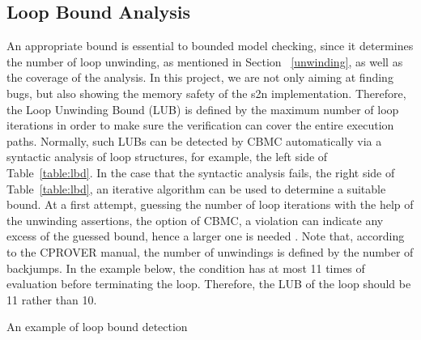 \subsection{Loop Bound Analysis}
\label{sec:lba}
An appropriate bound is essential to bounded model checking, since it determines the number of loop unwinding, as mentioned in Section ~\ref{unwinding}, as well as the coverage of the analysis. In this project, we are not only aiming at finding bugs, but also showing the memory safety of the s2n implementation. Therefore, the Loop Unwinding Bound (LUB) is defined by the maximum number of loop iterations in order to make sure the verification can cover the entire execution paths. Normally, such LUBs can be detected by CBMC automatically via a syntactic analysis of loop structures, for example, the left side of Table~\ref{table:lbd}. In the case that the syntactic analysis fails, the right side of Table~\ref{table:lbd}, an iterative algorithm can be used to determine a suitable bound. At a first attempt, guessing the number of loop iterations with the help of the unwinding assertions, the  option of CBMC, a violation can indicate any excess of the guessed bound, hence a larger one is needed \cite{4544862, ckl2004}. Note that, according to the CPROVER manual, the number of unwindings is defined by the number of backjumps. In the example below, the condition  has at most 11 times of evaluation before terminating the loop. Therefore, the LUB of the loop should be 11 rather than 10. 

\begin{table}[ht]
\centering
\begin{minipage}[t]{.4\textwidth}
\centering
{}
\end{minipage}\hfill
\begin{minipage}[t]{.5\textwidth}
\centering
{}
\end{minipage}
\hfill
{}
\caption{An example of loop bound detection}
\label{table:lbd}
\end{table}

